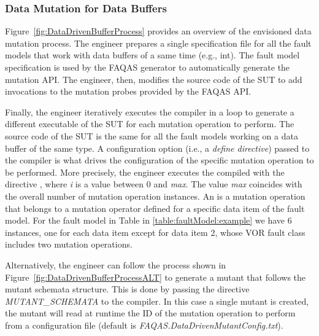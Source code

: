 \subsubsection{Data Mutation for Data Buffers}
\label{sec:FAQASDataMutationProbesBuffer}

Figure~\ref{fig:DataDrivenBufferProcess} provides an overview of the envisioned data mutation process. 
The engineer prepares a single specification file for all the fault models that work with data buffers of a same time (e.g., int). The fault model specification is used by the FAQAS generator to automatically generate the mutation API. The engineer, then, modifies the source code of the SUT to add invocations to the mutation probes provided by the FAQAS API. 

Finally, the engineer iteratively executes the compiler in a loop to generate a different executable of the SUT for each mutation operation to perform.
The source code of the SUT is the same for all the fault models working on a data buffer of the same type. A configuration option (i.e., a \emph{define directive}) passed to the compiler is what drives the configuration of the specific mutation operation to be performed. 
More precisely, the engineer executes the compiled with the directive , where \emph{i} is a value between 0 and \emph{max}. The value \emph{max} coincides with the
overall number of mutation operation instances. An  is a mutation operation that belongs to a mutation operator defined for a specific data item of the fault model. For the fault model in Table in \ref{table:faultModel:example} we have 6 instances, one for each data item except for data item 2, whose VOR fault class includes two mutation operations.

Alternatively, the engineer can follow the process shown in Figure~\ref{fig:DataDrivenBufferProcessALT} to generate a mutant that follows the mutant schemata structure. This is done by passing the directive \emph{MUTANT\_SCHEMATA} to the compiler. In this case a single mutant is created, the mutant will read at runtime the ID of the mutation operation to perform from a configuration file (default is \emph{FAQAS.DataDrivenMutantConfig.txt}).


